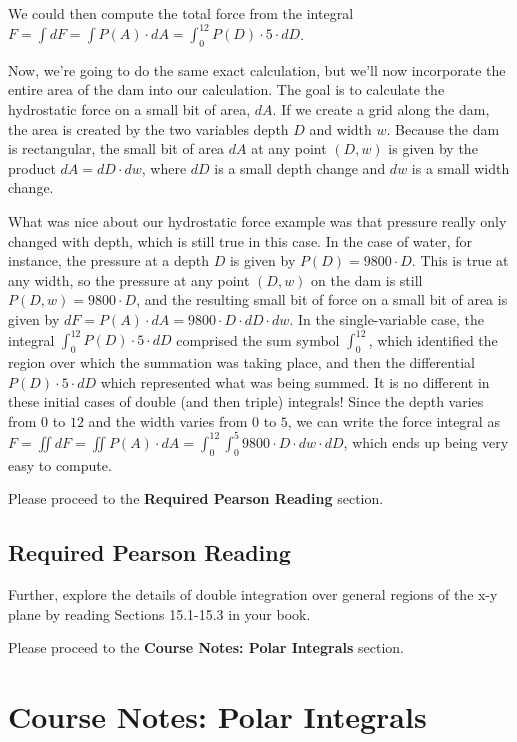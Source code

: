 \documentclass{ximera}
\begin{document}
We could then compute the total force from the integral $F=\int dF=\int P(A)\cdot dA=\int_0^{12}P(D)\cdot5\cdot dD$.

Now, we're going to do the same exact calculation, but we'll now incorporate the entire area of the dam into our calculation. The goal is to calculate the hydrostatic force on a small bit of area, $dA$. If we create a grid along the dam, the area is created by the two variables depth $D$ and width $w$. Because the dam is rectangular, the small bit of area $dA$ at any point $(D,w)$ is given by the product $dA=dD\cdot dw$, where $dD$ is a small depth change and $dw$ is a small width change.

What was nice about our hydrostatic force example was that pressure really only changed with depth, which is still true in this case. In the case of water, for instance, the pressure at a depth $D$ is given by $P(D)=9800\cdot D$. This is true at any width, so the pressure at any point $(D,w)$ on the dam is still $P(D,w)=9800\cdot D$, and the resulting small bit of force on a small bit of area is given by $dF=P(A)\cdot dA=9800\cdot D\cdot dD\cdot dw$. In the single-variable case, the integral $\int_0^{12}P(D)\cdot5\cdot dD$ comprised the sum symbol $\int_0^{12}$, which identified the region over which the summation was taking place, and then the differential $P(D)\cdot5\cdot dD$ which represented what was being summed. It is no different in these initial cases of double (and then triple) integrals! Since the depth varies from $0$ to $12$ and the width varies from $0$ to $5$, we can write the force integral as $F=\iint dF=\iint P(A)\cdot dA=\int_0^{12}\int_0^5 9800\cdot D\cdot dw\cdot dD$, which ends up being very easy to compute.

Please proceed to the \textbf{Required Pearson Reading} section.

\subsection{Required Pearson Reading}

Further, explore the details of double integration over general regions of the x-y plane by reading Sections 15.1-15.3 in your book.

Please proceed to the \textbf{Course Notes: Polar Integrals} section.

\section{Course Notes: Polar Integrals}
\end{document}
